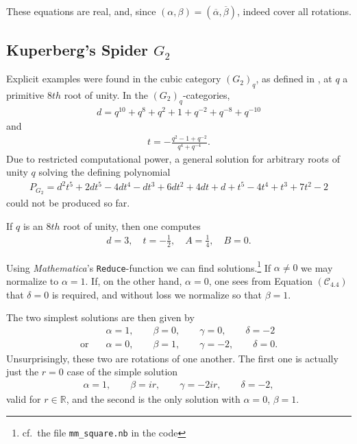 These equations are real, and, since $(\alpha,\beta) = (\overline{\alpha},\overline{\beta})$, indeed cover all rotations.

\subsection*{Kuperberg's Spider \texorpdfstring{$G_2$}{G2}}
Explicit examples were found in the cubic category $\left( G_2 \right)_q$, as defined in \cite[Def.\ 5.22]{Morrison2017Trivalent}, at $q$ a primitive $8th$ root of unity. 
In the $\left( G_2 \right)_q$-categories,
\begin{align*}
d = q^{10}+ q^8+ q^2+ 1 + q^{-2}+ q^{-8}+ q^{-10}
\end{align*}
and
\begin{align*}
t = - \frac{q^2 - 1 + q^{-2}}{q^4 + q^{-4}}.
\end{align*}
Due to restricted computational power, a general solution for arbitrary roots of unity $q$ solving the defining polynomial 
\begin{align*}
P_{G_2} = d^2t^5+ 2dt^5 - 4dt^4 - dt^3+ 6dt^2+ 4dt + d + t^5 - 4t^4+ t^3+ 7t^2 - 2 
\end{align*}
could not be produced so far. 

\bigno If $q$ is an $8th$ root of unity, then one computes 
\begin{align*}
d = 3,\quad t= -\frac{1}{2}, \quad A = \frac{1}{4}, \quad B = 0.
\end{align*}

Using \emph{Mathematica}'s \texttt{Reduce}-function we can find solutions.\footnote{cf.\ the file \texttt{mm\_square.nb} in the code} If $\alpha \neq 0$ we may normalize to $\alpha = 1$. If, on the other hand, $\alpha = 0$, one sees from Equation $(\mathcal{C}_4.4)$ that $\delta = 0$ is required, and without loss we normalize so that $\beta = 1$.

The two simplest solutions are then given by 
\begin{align*}
&
\alpha = 1, \qquad 
\beta = 0, \qquad
\gamma = 0, \qquad
\delta = -2 \\
\text{or}\quad&
\alpha = 0, \qquad 
\beta = 1, \qquad
\gamma = -2, \qquad
\delta = 0.
\end{align*}
Unsurprisingly, these two are rotations of one another. The first one is actually just the $r=0$ case of the simple solution
\begin{align*}
\alpha = 1, \qquad \beta = i r, \qquad \gamma = -2 i r ,\qquad \delta = -2,
\end{align*}
valid for $r\in\mathbb{R}$, and the second is the only solution with $\alpha = 0$, $\beta=1$.


